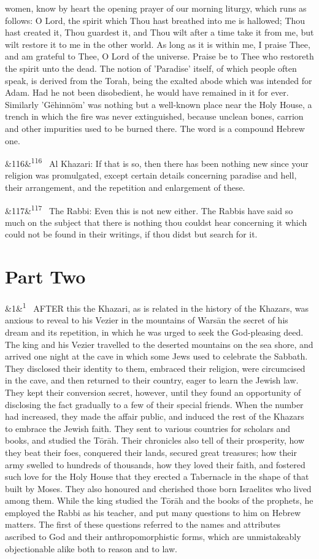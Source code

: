 \documentclass[12pt]{article}
\newcommand{\para}[1][]{\par\noindent\ifx&#1&\else\textsuperscript{\footnotesize #1}~\fi}
\begin{document}
women, know by heart the opening prayer of our morning liturgy, which runs as follows: O Lord, the spirit which Thou hast breathed into me is hallowed; Thou hast created it, Thou guardest it, and Thou wilt after a time take it from me, but wilt restore it to me in the other world. As long as it is within me, I praise Thee, and am grateful to Thee, O Lord of the universe. Praise be to Thee who restoreth the spirit unto the dead. The notion of 'Paradise' itself, of which people often speak, is derived from the Torah, being the exalted abode which was intended for Adam. Had he not been disobedient, he would have remained in it for ever. Similarly 'Gēhinnōm' was nothing but a well-known place near the Holy House, a trench in which the fire was never extinguished, because unclean bones, carrion and other impurities used to be burned there. The word is a compound Hebrew one.

\para[116] Al Khazari: If that is so, then there has been nothing new since your religion was promulgated, except certain details concerning paradise and hell, their arrangement, and the repetition and enlargement of these.

\para[117] The Rabbi: Even this is not new either. The Rabbis have said so much on the subject that there is nothing thou couldst hear concerning it which could not be found in their writings, if thou didst but search for it.

\section*{Part Two}

\para[1] AFTER this the Khazari, as is related in the history of the Khazars, was anxious to reveal to his Vezier in the mountains of Warsān the secret of his dream and its repetition, in which he was urged to seek the God-pleasing deed. The king and his Vezier travelled to the deserted mountains on the sea shore, and arrived one night at the cave in which some Jews used to celebrate the Sabbath. They disclosed their identity to them, embraced their religion, were circumcised in the cave, and then returned to their country, eager to learn the Jewish law. They kept their conversion secret, however, until they found an opportunity of disclosing the fact gradually to a few of their special friends. When the number had increased, they made the affair public, and induced the rest of the Khazars to embrace the Jewish faith. They sent to various countries for scholars and books, and studied the Tōrāh. Their chronicles also tell of their prosperity, how they beat their foes, conquered their lands, secured great treasures; how their army swelled to hundreds of thousands, how they loved their faith, and fostered such love for the Holy House that they erected a Tabernacle in the shape of that built by Moses. They also honoured and cherished those born Israelites who lived among them. While the king studied the Tōrāh and the books of the prophets, he employed the Rabbi as his teacher, and put many questions to him on Hebrew matters. The first of these questions referred to the names and attributes ascribed to God and their anthropomorphistic forms, which are unmistakeably objectionable alike both to reason and to law.
\end{document}
